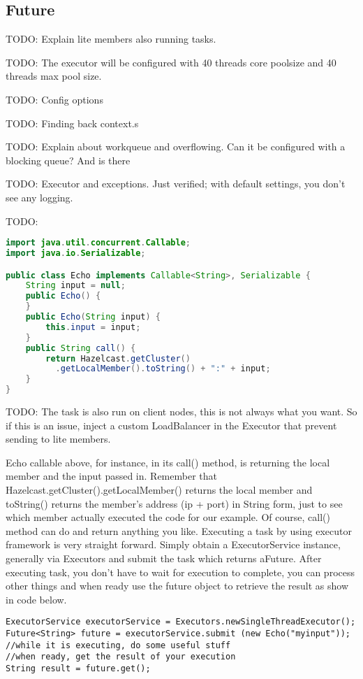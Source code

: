 \subsection{Future}

TODO: Explain lite members also running tasks.

TODO: The executor will be configured with 40 threads core poolsize and 40 threads max pool size.

TODO: Config options

TODO: Finding back context.s

TODO: Explain about workqueue and overflowing. Can it be configured with a blocking queue?
And is there 

TODO: Executor and exceptions. Just verified; with default settings, you don't see any logging.

TODO: 

\begin{lstlisting}[language=java]
import java.util.concurrent.Callable;
import java.io.Serializable;

public class Echo implements Callable<String>, Serializable {
    String input = null;
    public Echo() {
    }
    public Echo(String input) {
        this.input = input;
    }
    public String call() {
        return Hazelcast.getCluster()
          .getLocalMember().toString() + ":" + input;
    }
}
\end{lstlisting}


TODO: The task is also run on client nodes, this is not always what you want. So if this is an issue, inject a custom LoadBalancer in the Executor that prevent sending to lite members.

Echo callable above, for instance, in its call() method, is returning the local member and the input passed in. Remember that Hazelcast.getCluster().getLocalMember() returns the local member and toString() returns the member's address (ip + port) in String form, just to see which member actually executed the code for our example. Of course, call() method can do and return anything you like. Executing a task by using executor framework is very straight forward. Simply obtain a ExecutorService instance, generally via Executors and submit the task which returns aFuture. After executing task, you don't have to wait for execution to complete, you can process other things and when ready use the future object to retrieve the result as show in code below.

\begin{verbatim}
ExecutorService executorService = Executors.newSingleThreadExecutor();
Future<String> future = executorService.submit (new Echo("myinput"));
//while it is executing, do some useful stuff
//when ready, get the result of your execution
String result = future.get();
\end{verbatim}

